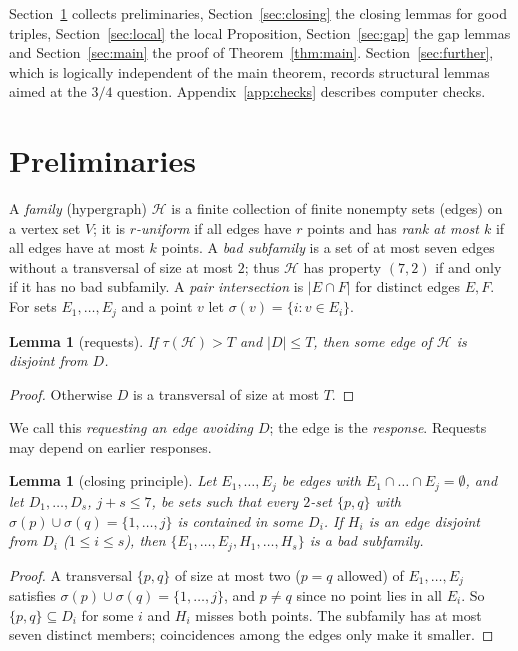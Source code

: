 \documentclass[11pt]{amsart}
\newtheorem{lemma}[theorem]{Lemma}
\theoremstyle{definition}
\theoremstyle{remark}
\newcommand{\cH}{\mathcal H}
\begin{document}
Section~\ref{sec:prelim} collects preliminaries, Section~\ref{sec:closing} the closing lemmas for good triples, Section~\ref{sec:local} the local Proposition, Section~\ref{sec:gap} the gap lemmas and Section~\ref{sec:main} the proof of Theorem~\ref{thm:main}. Section~\ref{sec:further}, which is logically independent of the main theorem, records structural lemmas aimed at the $3/4$ question. Appendix~\ref{app:checks} describes computer checks.

\section{Preliminaries}\label{sec:prelim}

A \emph{family} (hypergraph) $\cH$ is a finite collection of finite nonempty sets (edges) on a vertex set $V$; it is \emph{$r$-uniform} if all edges have $r$ points and has \emph{rank at most $k$} if all edges have at most $k$ points. A \emph{bad subfamily} is a set of at most seven edges without a transversal of size at most $2$; thus $\cH$ has property $(7,2)$ if and only if it has no bad subfamily. A \emph{pair intersection} is $|E\cap F|$ for distinct edges $E,F$. For sets $E_1,\dots,E_j$ and a point $v$ let $\sigma(v)=\{i:v\in E_i\}$.

\begin{lemma}[requests]\label{lem:request}
If $\tau(\cH)>T$ and $|D|\le T$, then some edge of $\cH$ is disjoint from $D$.
\end{lemma}
\begin{proof}
Otherwise $D$ is a transversal of size at most $T$.
\end{proof}
We call this \emph{requesting an edge avoiding $D$}; the edge is the \emph{response}. Requests may depend on earlier responses.

\begin{lemma}[closing principle]\label{lem:close}
Let $E_1,\dots,E_j$ be edges with $E_1\cap\dots\cap E_j=\emptyset$, and let $D_1,\dots,D_s$, $j+s\le7$, be sets such that every $2$-set $\{p,q\}$ with $\sigma(p)\cup\sigma(q)=\{1,\dots,j\}$ is contained in some $D_i$. If $H_i$ is an edge disjoint from $D_i$ ($1\le i\le s$), then $\{E_1,\dots,E_j,H_1,\dots,H_s\}$ is a bad subfamily.
\end{lemma}
\begin{proof}
A transversal $\{p,q\}$ of size at most two ($p=q$ allowed) of $E_1,\dots,E_j$ satisfies $\sigma(p)\cup\sigma(q)=\{1,\dots,j\}$, and $p\ne q$ since no point lies in all $E_i$. So $\{p,q\}\subseteq D_i$ for some $i$ and $H_i$ misses both points. The subfamily has at most seven distinct members; coincidences among the edges only make it smaller.
\end{proof}
\end{document}
